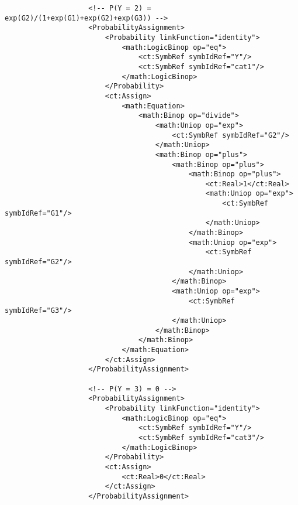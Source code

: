 \begin{lstlisting}
                    <!-- P(Y = 2) = exp(G2)/(1+exp(G1)+exp(G2)+exp(G3)) --> 
                    <ProbabilityAssignment>
                        <Probability linkFunction="identity">
                            <math:LogicBinop op="eq">
                                <ct:SymbRef symbIdRef="Y"/>
                                <ct:SymbRef symbIdRef="cat1"/>
                            </math:LogicBinop>
                        </Probability>
                        <ct:Assign>
                            <math:Equation>
                                <math:Binop op="divide">
                                    <math:Uniop op="exp">
                                        <ct:SymbRef symbIdRef="G2"/>
                                    </math:Uniop>
                                    <math:Binop op="plus">
                                        <math:Binop op="plus">
                                            <math:Binop op="plus">
                                                <ct:Real>1</ct:Real>
                                                <math:Uniop op="exp">
                                                    <ct:SymbRef symbIdRef="G1"/>
                                                </math:Uniop>
                                            </math:Binop>
                                            <math:Uniop op="exp">
                                                <ct:SymbRef symbIdRef="G2"/>
                                            </math:Uniop>
                                        </math:Binop>
                                        <math:Uniop op="exp">
                                            <ct:SymbRef symbIdRef="G3"/>
                                        </math:Uniop>
                                    </math:Binop>
                                </math:Binop>
                            </math:Equation>
                        </ct:Assign>
                    </ProbabilityAssignment>
                    
                    <!-- P(Y = 3) = 0 -->
                    <ProbabilityAssignment>
                        <Probability linkFunction="identity">
                            <math:LogicBinop op="eq">
                                <ct:SymbRef symbIdRef="Y"/>
                                <ct:SymbRef symbIdRef="cat3"/>
                            </math:LogicBinop>
                        </Probability>
                        <ct:Assign>
                            <ct:Real>0</ct:Real>
                        </ct:Assign>
                    </ProbabilityAssignment>
                    

\end{lstlisting}
